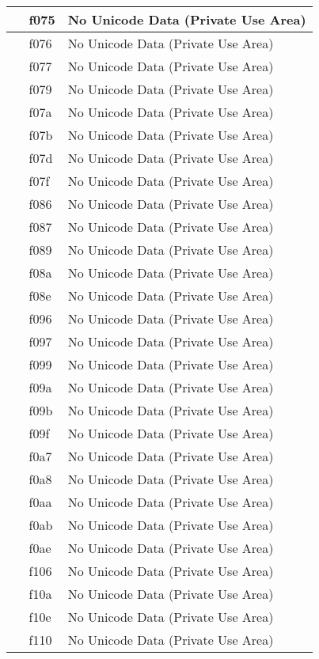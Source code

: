 \documentclass[12pt,letterpaper,openany]{book}
\begin{document}
\begin{center}
\begin{supertabular}{|m{0.25in}|m{0.5in}|m{4in}|}
 & f075 & No Unicode Data (Private Use Area)\\\hline
 & f076 & No Unicode Data (Private Use Area)\\\hline
 & f077 & No Unicode Data (Private Use Area)\\\hline
 & f079 & No Unicode Data (Private Use Area)\\\hline
 & f07a & No Unicode Data (Private Use Area)\\\hline
 & f07b & No Unicode Data (Private Use Area)\\\hline
 & f07d & No Unicode Data (Private Use Area)\\\hline
 & f07f & No Unicode Data (Private Use Area)\\\hline
 & f086 & No Unicode Data (Private Use Area)\\\hline
 & f087 & No Unicode Data (Private Use Area)\\\hline
 & f089 & No Unicode Data (Private Use Area)\\\hline
 & f08a & No Unicode Data (Private Use Area)\\\hline
 & f08e & No Unicode Data (Private Use Area)\\\hline
 & f096 & No Unicode Data (Private Use Area)\\\hline
 & f097 & No Unicode Data (Private Use Area)\\\hline
 & f099 & No Unicode Data (Private Use Area)\\\hline
 & f09a & No Unicode Data (Private Use Area)\\\hline
 & f09b & No Unicode Data (Private Use Area)\\\hline
 & f09f & No Unicode Data (Private Use Area)\\\hline
 & f0a7 & No Unicode Data (Private Use Area)\\\hline
 & f0a8 & No Unicode Data (Private Use Area)\\\hline
 & f0aa & No Unicode Data (Private Use Area)\\\hline
 & f0ab & No Unicode Data (Private Use Area)\\\hline
 & f0ae & No Unicode Data (Private Use Area)\\\hline
 & f106 & No Unicode Data (Private Use Area)\\\hline
 & f10a & No Unicode Data (Private Use Area)\\\hline
 & f10e & No Unicode Data (Private Use Area)\\\hline
 & f110 & No Unicode Data (Private Use Area)\\\hline

\end{supertabular}
\end{center}
\end{document}
